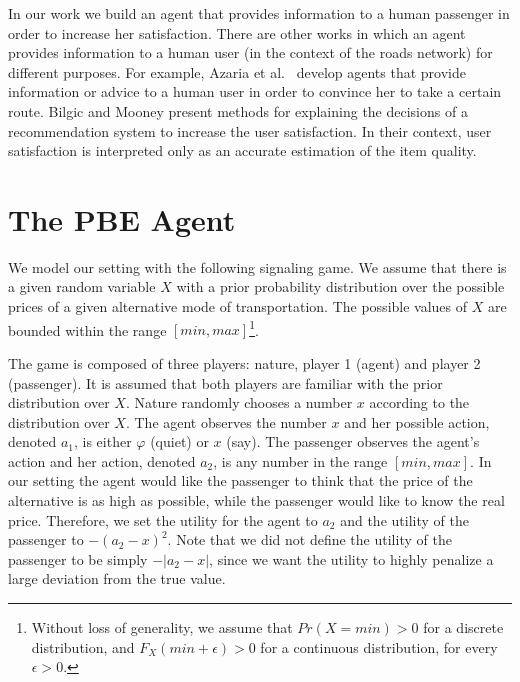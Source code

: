 \documentclass[letterpaper]{article} %
\begin{document}
In our work we build an agent that provides information to a human passenger in order to increase her satisfaction. There are other works in which an agent provides information to a human user (in the context of the roads network) for different purposes. For example, Azaria et al.~ develop agents that provide information or advice to a human user in order to convince her to take a certain route. Bilgic and Mooney \cite{bilgic2005explaining} present methods for explaining the decisions of a recommendation system to increase the user satisfaction. In their context, user satisfaction is interpreted only as an accurate estimation of the item quality.



\section{The PBE Agent}

We model our setting with the following signaling game.
We assume that there is a given random variable $X$ with a prior probability distribution over the possible prices of a given alternative mode of transportation. The possible values of $X$ are bounded within the range $[min,max]$\footnote{Without loss of generality, we assume that $Pr(X=min)>0$ for a discrete distribution, and $F_X(min+\epsilon)>0$ for a continuous distribution, for every $\epsilon > 0$.}.

The game is composed of three players: nature, player 1 (agent) and player 2 (passenger). It is assumed that both players are familiar with the prior distribution over $X$.
Nature randomly chooses a number $x$ according to the distribution over $X$.
The agent observes the number $x$ and her possible action, denoted $a_1$, is either  $\varphi$ (quiet) or $x$ (say).
The passenger observes the agent's action and her action, denoted $a_2$, is any number in the range $[min,max]$.
In our setting the agent would like the passenger to think that the price of the alternative is as high as possible, while the passenger would like to know the real price. Therefore, we set the utility for the agent to $a_2$ and the utility of the passenger to $-(a_2-x)^2$. Note that we did not define the utility of the passenger to be simply $-|a_2-x|$, since we want the utility to highly penalize a large deviation from the true value.
\end{document}
